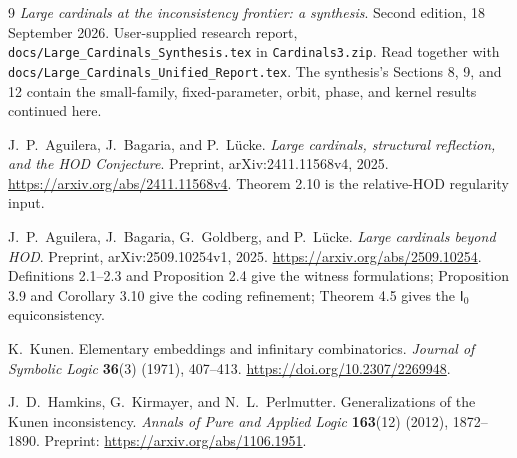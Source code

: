 \documentclass[11pt,letterpaper]{article}
\theoremstyle{definition}
\newcommand{\Izero}{\mathsf I_0}
\begin{document}
\begin{thebibliography}{9}
\emph{Large cardinals at the inconsistency frontier: a synthesis}.
Second edition, 18 September 2026. User-supplied research report,
\nolinkurl{docs/Large_Cardinals_Synthesis.tex} in \nolinkurl{Cardinals3.zip}.
Read together with \nolinkurl{docs/Large_Cardinals_Unified_Report.tex}.
The synthesis's Sections 8, 9, and 12 contain the small-family, fixed-parameter, orbit, phase, and kernel results continued here.

J.~P.~Aguilera, J.~Bagaria, and P.~L\"ucke.
\emph{Large cardinals, structural reflection, and the HOD Conjecture}.
Preprint, arXiv:2411.11568v4, 2025.
\url{https://arxiv.org/abs/2411.11568v4}.
Theorem 2.10 is the relative-HOD regularity input.

J.~P.~Aguilera, J.~Bagaria, G.~Goldberg, and P.~L\"ucke.
\emph{Large cardinals beyond HOD}.
Preprint, arXiv:2509.10254v1, 2025.
\url{https://arxiv.org/abs/2509.10254}.
Definitions 2.1--2.3 and Proposition 2.4 give the witness formulations;
Proposition 3.9 and Corollary 3.10 give the coding refinement;
Theorem 4.5 gives the $\Izero$ equiconsistency.

K.~Kunen.
Elementary embeddings and infinitary combinatorics.
\emph{Journal of Symbolic Logic} \textbf{36}(3) (1971), 407--413.
\url{https://doi.org/10.2307/2269948}.

J.~D.~Hamkins, G.~Kirmayer, and N.~L.~Perlmutter.
Generalizations of the Kunen inconsistency.
\emph{Annals of Pure and Applied Logic} \textbf{163}(12) (2012), 1872--1890.
Preprint: \url{https://arxiv.org/abs/1106.1951}.

\end{thebibliography}
\end{document}
